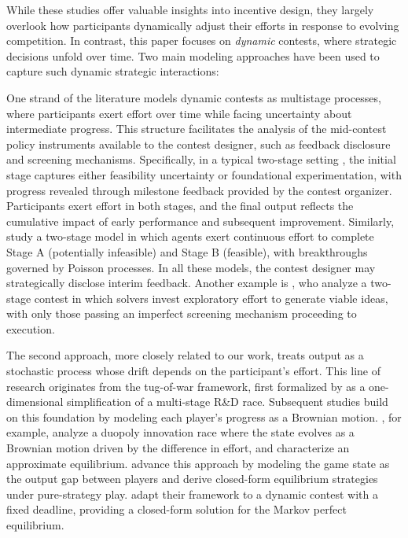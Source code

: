 \documentclass[mnsc]{informs3}
\begin{document}
While these studies offer valuable insights into incentive design, they largely overlook how participants dynamically adjust their efforts in response to evolving competition.
In contrast, this paper focuses on \textit{dynamic} contests, where strategic decisions unfold over time.
Two main modeling approaches have been used to capture such dynamic strategic interactions:

One strand of the literature models dynamic contests as multistage processes, where participants exert effort over time while facing uncertainty about intermediate progress.
This structure facilitates the analysis of the mid-contest policy instruments available to the contest designer, such as feedback disclosure and screening mechanisms.
Specifically, in a typical two-stage setting \citep{aoyagi2010information, mihm2019feedback}, the initial stage captures either feasibility uncertainty or foundational experimentation, with progress revealed through milestone feedback provided by the contest organizer.
Participants exert effort in both stages, and the final output reflects the cumulative impact of early performance and subsequent improvement.
Similarly, \citet{bimpikis2019designing} study a two-stage model in which agents exert continuous effort to complete Stage A (potentially infeasible) and Stage B (feasible), with breakthroughs governed by Poisson processes.
In all these models, the contest designer may strategically disclose interim feedback.
Another example is \citet{Khorasani2023screening}, who analyze a two-stage contest in which solvers invest exploratory effort to generate viable ideas, with only those passing an imperfect screening mechanism proceeding to execution.

The second approach, more closely related to our work, treats output as a stochastic process whose drift depends on the participant’s effort.
This line of research originates from the tug-of-war framework, first formalized by \citet{Harris1987Race} as a one-dimensional simplification of a multi-stage R\&D race.
Subsequent studies build on this foundation by modeling each player’s progress as a Brownian motion.
\citet{budd1993Duopoly}, for example, analyze a duopoly innovation race where the state evolves as a Brownian motion driven by the difference in effort, and characterize an approximate equilibrium.
\citet{Moscarini2007Contest} advance this approach by modeling the game state as the output gap between players and derive closed-form equilibrium strategies under pure-strategy play.
\citet{Ryvkin2022Fight} adapt their framework to a dynamic contest with a fixed deadline, providing a closed-form solution for the Markov perfect equilibrium.
\end{document}
